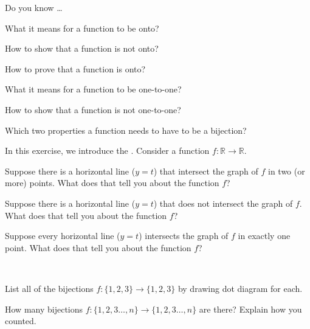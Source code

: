 \begin{exer}[\exerR] %
\label{exer_dyk_1to1_onto}
    Do you know \ldots
        \begin{exerpart}
            \item What it means for a function to be onto?
            \item How to show that a function is not onto?
            \item How to prove that a function is onto?
            \item What it means for a function to be one-to-one?
            \item How to show that a function is not one-to-one?
            \item Which two properties a function needs to have to be a bijection? 
        \end{exerpart}
\end{exer}

\begin{exer}[\exerE] %
\label{exer_horiz_line_test}
    In this exercise, we introduce the .  Consider a function $f: \mathbb{R} \to \mathbb{R}$.
        \begin{apart}
            \item Suppose there is a horizontal line ($y=t$) that intersect the graph of $f$ in two (or more) points.  What does that tell you about the function $f$?
            \item Suppose there is a horizontal line ($y=t$) that does not intersect the graph of $f$.  What does that tell you about the function $f$?
            \item Suppose every horizontal line ($y=t$) intersects the graph of $f$ in exactly one point.  What does that tell you about the function $f$?
        \end{apart}
\end{exer}

\begin{exer} [\exerE] %
\label{exer_count_bijections}
~
    \begin{apart}
        \item List all of the bijections $f: \{1,2,3\} \to \{1,2,3\}$ by drawing dot diagram for each.
        \item How many bijections $f: \{1,2,3 \ldots,n\} \to \{1,2,3 \ldots,n\}$ are there? Explain how you counted.
    \end{apart}
\end{exer}

